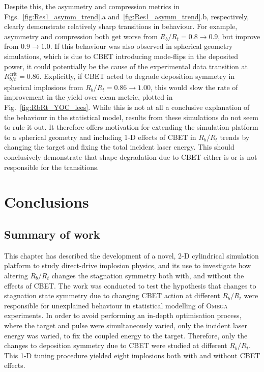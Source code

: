 Despite this, the asymmetry and compression metrics in Figs.~\ref{fig:Res1_asymm_trend}.a and~\ref{fig:Res1_asymm_trend}.b, respectively, clearly demonstrate relatively sharp transitions in behaviour.
For example, asymmetry and compression both get worse from $R_b/R_t=0.8\rightarrow0.9$, but improve from $0.9\rightarrow1.0$.
If this behaviour was also observed in spherical geometry simulations, which is due to \ac{CBET} introducing mode-flips in the deposited power, it could potentially be the cause of the experimental data transition at $R_{b/t}^{\text{crit}}=0.86$.
Explicitly, if \ac{CBET} acted to degrade deposition symmetry in spherical implosions from $R_b/R_t=0.86\rightarrow1.00$, this would slow the rate of improvement in the yield over clean metric, plotted in Fig.~\ref{fig:RbRt_YOC_lees}.
While this is not at all a conclusive explanation of the behaviour in the statistical model, results from these simulations do not seem to rule it out.
It therefore offers motivation for extending the simulation platform to a spherical geometry and including 1-D effects of \ac{CBET} in $R_b/R_t$ trends by changing the target and fixing the total incident laser energy.
This should conclusively demonstrate that shape degradation due to \ac{CBET} either is or is not responsible for the transitions.

\section{Conclusions}%
\label{sec:Res1_Conclusions}

\subsection{Summary of work}%
\label{sec:Res1_Summary}

This chapter has described the development of a novel, 2-D cylindrical simulation platform to study direct-drive implosion physics, and its use to investigate how altering $R_b/R_t$ changes the stagnation symmetry both with, and without the effects of \ac{CBET}.
The work was conducted to test the hypothesis that changes to stagnation state symmetry due to changing \ac{CBET} action at different $R_b/R_t$ were responsible for unexplained behaviour in statistical modelling of \textsc{Omega} experiments.
In order to avoid performing an in-depth optimisation process, where the target and pulse were simultaneously varied, only the incident laser energy was varied, to fix the coupled energy to the target.
Therefore, only the changes to deposition symmetry due to \ac{CBET} were studied at different $R_b/R_t$.
This 1-D tuning procedure yielded eight implosions both with and without \ac{CBET} effects.

